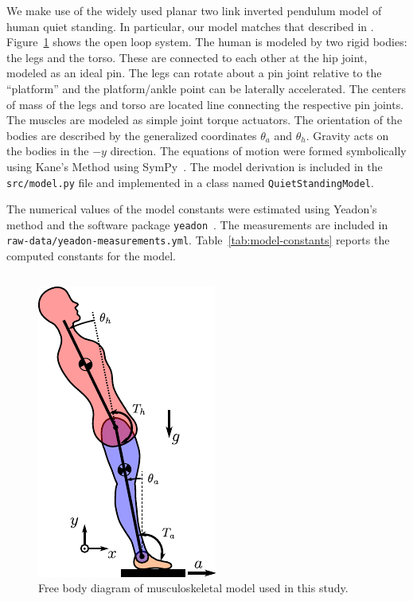 \documentclass{article}
\begin{document}
We make use of the widely used planar two link inverted pendulum model of human
quiet standing. In particular, our model matches that described in
\cite{Park2004}. Figure~\ref{fig:free-body-diagram} shows the open loop system.
The human is modeled by two rigid bodies: the legs and the torso. These are
connected to each other at the hip joint, modeled as an ideal pin. The legs can
rotate about a pin joint relative to the ``platform'' and the platform/ankle
point can be laterally accelerated. The centers of mass of the legs and torso
are located line connecting the respective pin joints. The muscles are modeled
as simple joint torque actuators. The orientation of the bodies are described
by the generalized coordinates $\theta_a$ and $\theta_h$. Gravity acts on the
bodies in the $-y$ direction. The equations of motion were formed symbolically
using Kane's Method \cite{Kane1985} using SymPy~\cite{Gede2013}. The model
derivation is included in the \verb|src/model.py| file and implemented in a
class named \verb|QuietStandingModel|.

The numerical values of the model constants were estimated using Yeadon's
method and the software package \verb|yeadon|~\cite{Dembia2014}. The
measurements are included in \verb|raw-data/yeadon-measurements.yml|.
Table~\ref{tab:model-constants} reports the computed constants for the model.

\begin{equation}
  
\end{equation}

\begin{figure}
  \centering
  \includegraphics{figures/free-body-diagram.pdf}
  \caption{Free body diagram of musculoskeletal model used in this study.}
  \label{fig:free-body-diagram}
\end{figure}
\end{document}
